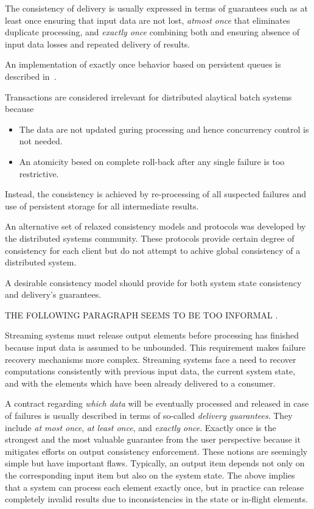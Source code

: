 The consistency of delivery is usually expressed in terms of guarantees  such as  {at least once}  ensuring that  input data are not lost, {\em atmost once}  that eliminates duplicate processing, and {\em exactly once} combining both and ensuring absence of  input data losses and repeated delivery of results.   

An implementation of exactly once behavior based on persistent queues is described in~\cite{DBLP:books/mk/WeikumV2002}.  

Transactions are considered irrelevant for distributed alaytical batch systems  because 

\begin {itemize}
\item The data are not updated guring processing and hence concurrency control is not needed.
\item An atomicity besed on complete roll-back after any single failure is too restrictive. 
\end {itemize}

Instead, the consistency is achieved by re-processing of all suspected failures and use of persistent storage for all intermediate results.

An alternative set of relaxed consistency models and protocols was developed by the distributed systems community. These protocols provide certain degree of consistency for each client but do not attempt to achive global consistency of a distributed system.

A desirable consistency model should provide for both system state consistency and delivery's guarantees. 

THE FOLLOWING PARAGRAPH SEEMS TO BE TOO INFORMAL .      

Streaming systems must release output elements before processing has finished because input data is assumed to be unbounded. This requirement makes failure recovery mechanisms more complex. Streaming systems face a need to recover computations consistently with previous input data, the current system state, and with the elements which have been already delivered to a consumer. 

A contract regarding {\em which data} will be eventually processed and released in case of failures is usually described in terms of so-called {\em delivery guarantees}. They include {\em at most once}, {\em at least once}, and {\em exactly once}. Exactly once is the strongest and the most valuable guarantee from the user perspective because it mitigates efforts on output consistency enforcement. 
These notions are seemingly simple but have important flaws. Typically, an output item depends not only on the corresponding input item but also on the system state. 
The above implies that a system can process each element exactly once, but in practice can release completely invalid results due to inconsistencies in the state or in-flight elements.

